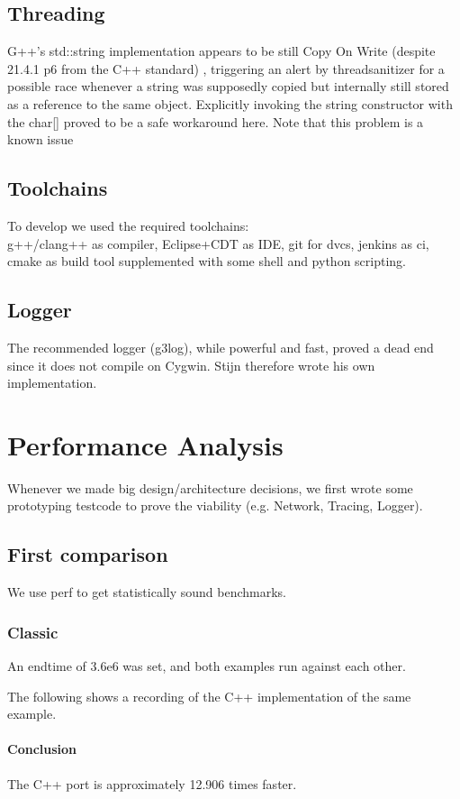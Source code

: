 \documentclass[8pt,a4paper]{report}
\begin{document}
\section{Threading}
G++'s std::string implementation appears to be still Copy On Write (despite 21.4.1 p6 from the C++ standard) \cite{cpp}, triggering an alert by threadsanitizer for a possible race whenever a string was supposedly copied but internally still stored as a reference to the same object. Explicitly invoking the string constructor with the char[] proved to be a safe workaround here. Note that this problem is a known issue \cite{cow}
\section{Toolchains}
To develop we used the required toolchains:\\ g++/clang++ as compiler, Eclipse+CDT as IDE, git for dvcs, jenkins as ci, cmake as build tool supplemented with some shell and python scripting.
\section{Logger}
The recommended logger (g3log), while powerful and fast, proved a dead end since it does not compile on Cygwin. 
Stijn therefore wrote his own implementation. %
\chapter{Performance Analysis}
Whenever we made big design/architecture decisions, we first wrote some prototyping testcode to prove the viability (e.g. Network, Tracing, Logger).
\section{First comparison}
We use perf to get statistically sound benchmarks.
\subsection{Classic}
An endtime of 3.6e6 was set, and both examples run against each other.

The following shows a recording of the C++ implementation of the same example.\\

\subsubsection{Conclusion}
The C++ port is approximately 12.906 times faster.
\end{document}
